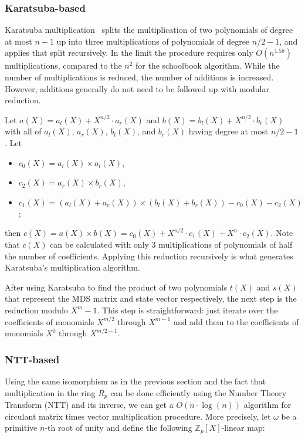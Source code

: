 \documentclass[a4paper]{article}
\begin{document}
\subsubsection{Karatsuba-based}

Karatsuba multiplication~\cite{karatsuba1962multiplication} splits the multiplication of two polynomials of degree at most $n-1$ up into three multiplications of polynomials of degree $n/2 - 1$, and applies that split recursively. In the limit the procedure requires only $O(n^{1.58})$ multiplications, compared to the $n^2$ for the schoolbook algorithm. While the number of multiplications is reduced, the number of additions is increased. However, additions generally do not need to be followed up with modular reduction.

Let $a(X) = a_l(X) + X^{n/2} \cdot a_r(X)$ and $b(X) = b_l(X) + X^{n/2} \cdot b_r(X)$ with all of $a_l(X)$, $a_r(X)$, $b_l(X)$, and $b_r(X)$ having degree at most $n/2-1$. Let
\begin{itemize}
\item $c_0(X) = a_l(X) \times a_l(X)$,
\item $c_2(X) = a_r(X) \times b_r(X)$,
\item $c_1(X) = (a_l(X) + a_r(X)) \times (b_l(X) + b_r(X)) - c_0(X) - c_2(X)$;
\end{itemize}
then $c(X) = a(X) \times b(X) = c_0(X) + X^{n/2} \cdot c_1(X) + X^n \cdot c_2(X)$. Note that $c(X)$ can be calculated with only $3$ multiplications of polynomials of half the number of coefficients. Applying this reduction recursively is what generates Karatsuba's multiplication algorithm.

After using Karatsuba to find the product of two polynomials $t(X)$ and $s(X)$ that represent the MDS matrix and state vector respectively, the next step is the reduction modulo $X^m-1$. This step is straightforward: just iterate over the coefficients of monomials $X^{m/2}$ through $X^{m-1}$ and add them to the coefficients of monomials $X^0$ through $X^{m/2-1}$.

\subsubsection{NTT-based}

Using the same isomorphism as in the previous section and the fact that multiplication in the ring $R_p$ can be done efficiently using the Number Theory Transform (NTT) and its inverse, we can get a $O(n \cdot\log(n))$ algorithm for circulant matrix times vector multiplication procedure. More precisely, let $\omega$ be a primitive $n$-th root of unity and define the following ${\mathbb{Z}_p[X]}$-linear map:
\end{document}
